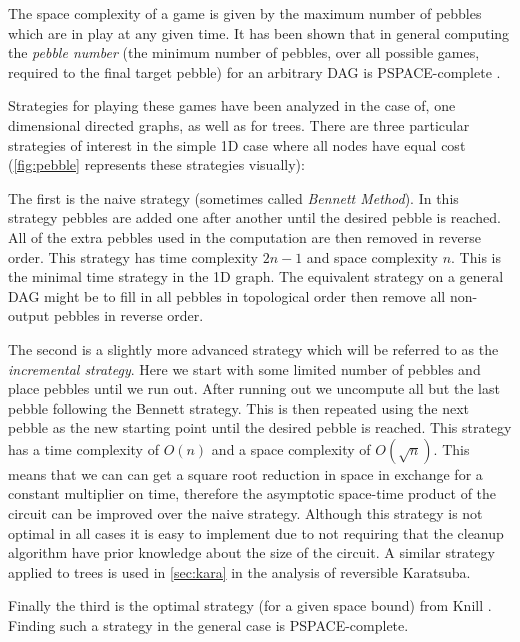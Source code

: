 The space complexity of a game is given by the maximum number of pebbles which
are in play at any given time. It has been shown that in general computing the
\emph{pebble number} (the minimum number of pebbles, over all possible games,
required to the final target pebble) for an arbitrary DAG is
PSPACE-complete\cite{chan13} .

Strategies for playing these games have been analyzed in the case of, one
dimensional directed graphs, as well as for trees\cite{peb16}.  There are three
particular strategies of interest in the simple 1D case where all nodes have
equal cost (\cref{fig:pebble} represents these strategies visually):

The first is the naive strategy (sometimes called \emph{Bennett Method}). In
this strategy pebbles are added one after another until the desired pebble is
reached.  All of the extra pebbles used in the computation are then removed in
reverse order. This strategy has time complexity $2n-1$ and space complexity
$n$. This is the minimal time strategy in the 1D graph. The equivalent strategy
on a general DAG might be to fill in all pebbles in topological order then
remove all non-output pebbles in reverse order.

The second is a slightly more advanced strategy which will be referred to as
the \emph{incremental strategy}. Here we start with some limited number of
pebbles and place pebbles until we run out. After running out we uncompute all
but the last pebble following the Bennett strategy. This is then repeated using
the next pebble as the new starting point until the desired pebble is reached.
This strategy has a time complexity of $O(n)$ and a space complexity of
$O(\sqrt n)$. This means that we can can get a square root reduction in space
in exchange for a constant multiplier on time, therefore the asymptotic
space-time product of the circuit can be improved over the naive strategy.
Although this strategy is not optimal in all cases it is easy to implement due
to not requiring that the cleanup algorithm have prior knowledge about the size
of the circuit. A similar strategy applied to trees is used in \cref{sec:kara}
in the analysis of reversible Karatsuba.

Finally the third is the optimal strategy (for a given space bound) from Knill
\cite{knill:95}. Finding such a strategy in the general case is
PSPACE-complete.  

